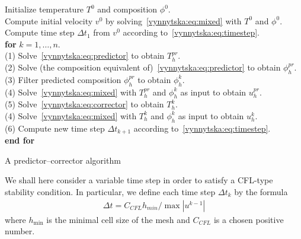 \begin{algorithm}
  \begin{tabbing}
    Initialize temperature $T^0$ and composition $\phi^0$. \\
    Compute initial velocity $v^0$ by
    solving~\eqref{vynnytska:eq:mixed} with $T^0$ and $\phi^0$. \\
    Compute time step $\Delta t_1$ from $v^0$ according
    to~\eqref{vynnytska:eq:timestep}. \\
    \textbf{for}  {$k = 1, \dots, n$}. \\
    \tab (1) Solve~\eqref{vynnytska:eq:predictor} to obtain $T_h^{pr}$. \\
    \tab (2) Solve (the composition equivalent
    of)~\eqref{vynnytska:eq:predictor} to obtain $\phi_h^{pr}$. \\
    \tab (3) Filter predicted composition $\phi_h^{pr}$ to
    obtain $\phi_h^{k}$. \\
    \tab (4) Solve~\eqref{vynnytska:eq:mixed} with $T_h^{pr}$ and
    $\phi_h^{k}$ as input to obtain $u_h^{pr}$. \\
    \tab (5) Solve~\eqref{vynnytska:eq:corrector} to obtain $T_h^{k}$. \\
    \tab (4) Solve~\eqref{vynnytska:eq:mixed} with $T_h^{k}$ and
    $\phi_h^{k}$ as input to obtain $u_h^{k}$. \\
    \tab (6) Compute new time step $\Delta t_{k+1}$ according
    to~\eqref{vynnytska:eq:timestep}. \\
    \textbf{end for}
  \end{tabbing}
  \caption{A predictor--corrector algorithm}
  \label{vynnytska:alg:algorithm}
\end{algorithm}

We shall here consider a variable time step in order to satisfy a
CFL-type stability condition. In particular, we define each time step
$\Delta t_k$ by the formula
\begin{align}
   \label{vynnytska:eq:timestep}
   \Delta t =  C_{CFL} h_{min} / \max{|u^{k-1}|}
\end{align}
where $h_{\min}$ is the minimal cell size of the mesh and $C_{CFL}$ is
a chosen positive number.

